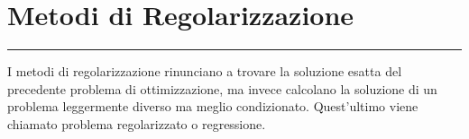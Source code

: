 {\color{ggreen}\section{Metodi di Regolarizzazione}}
\textcolor{ggreen}{\rule[5pt]{\textwidth}{1pt}}
I metodi di regolarizzazione rinunciano a trovare la soluzione esatta del 
precedente problema di ottimizzazione, ma invece calcolano la soluzione di un problema 
leggermente diverso ma meglio condizionato. Quest’ultimo viene chiamato problema 
regolarizzato o regressione.